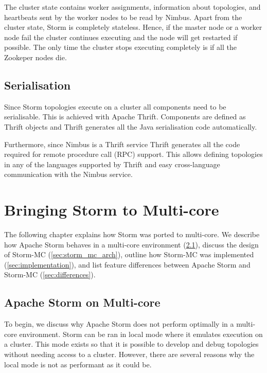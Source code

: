 \documentclass[bsc,deptreport,twoside,singlespacing,normalheadings,parskip]{infthesis}\usepackage[]{graphicx}\usepackage[]{color}
\begin{document}
The cluster state contains worker assignments, information about topologies, and heartbeats sent by the worker nodes to be read by Nimbus. Apart from the cluster state, Storm is completely stateless. Hence, if the master node or a worker node fail the cluster continues executing and the node will get restarted if possible. The only time the cluster stops executing  completely is if all the Zookeper nodes die.

\section{Serialisation}
\label{sec:serialisation}

Since Storm topologies execute on a cluster all components need to be serialisable. This is achieved with Apache Thrift. Components are defined as Thrift objects and Thrift generates all the Java serialisation code automatically.

Furthermore, since Nimbus is a Thrift service Thrift generates all the code required for remote procedure call (RPC) support. This allows defining topologies in any of the languages supported by Thrift and easy cross-language communication with the Nimbus service.

\clearpage{}

\clearpage{}\chapter{Bringing Storm to Multi-core}

The following chapter explains how Storm was ported to multi-core. We describe how Apache Storm behaves in a multi-core environment (\ref{sec:storm_on_mc}), discuss the design of Storm-MC (\ref{sec:storm_mc_arch}), outline how Storm-MC was implemented (\ref{sec:implementation}), and list feature differences between Apache Storm and Storm-MC (\ref{sec:differences}).

\section{Apache Storm on Multi-core}
\label{sec:storm_on_mc}

To begin, we discuss why Apache Storm does not perform optimally in a multi-core environment. Storm can be ran in local mode where it emulates execution on a cluster. This mode exists so that it is possible to develop and debug topologies without needing access to a cluster. However, there are several reasons why the local mode is not as performant as it could be.
\end{document}
